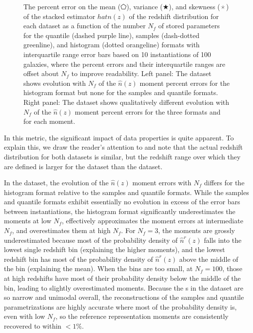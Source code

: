 \begin{figure}
\begin{center}
		\caption{
			The percent error on the mean ($\pentagon$), variance ($\bigstar$), and 
			skewness ($\APLstar$) of the stacked estimator $hat{n}(z)$ of the redshift 
			distribution for each dataset as a function of the number $N_{f}$ of stored 
			parameters for the quantile (dashed purple line), samples (dash-dotted 
			greenline), and histogram (dotted orangeline) formats with interquartile range 
			error bars based on 10 instantiations of 100 galaxies, where the percent errors 
			and their interquartile ranges are offset about $N_{f}$ to improve readability.
			Left panel: The \mgdata dataset shows evolution with $N_{f}$ of the 
			$\hat{n}(z)$ moment percent errors for the histogram format but none for the 
			samples and quantile formats.
			Right panel: The \ssdata dataset shows qualitatively different evolution 
			with $N_{f}$ of the $\hat{n}(z)$ moment percent errors for the three formats 
			and for each moment.
			}
	\end{center}
\end{figure}
In this metric, the significant impact of data properties is quite apparent.
To explain this, we draw the reader's attention to  and 
note that the actual redshift distribution for both datasets is similar, but 
the redshift range over which they are defined is larger for the \mgdata 
dataset than the \ssdata dataset.

In the \mgdata dataset, the evolution of the $\hat{n}(z)$ moment errors with 
$N_{f}$ differs for the histogram format relative to the samples and quantile 
formats.
While the samples and quantile formats exhibit essentially no evolution in 
excess of the error bars between instantiations, the histogram format 
significantly underestimates the moments at low $N_{f}$, effectively 
approximates the moment errors at intermediate $N_{f}$, and overestimates them 
at high $N_{f}$.
For $N_{f}=3$, the moments are grossly underestimated because most of the 
probability density of $\hat{n}^{r}(z)$ falls into the lowest single redshift 
bin (explaining the higher moments), and the lowest redshift bin has most of 
the probability density of $\hat{n}^{r}(z)$ above the middle of the bin 
(explaining the mean).
When the bins are too small, at $N_{f}=100$, those at high redshifts have most 
of their probability density below the middle of the bin, leading to slightly 
overestimated moments.
Because the \pz s in the \mgdata dataset are so narrow and unimodal overall, 
the reconstructions of the samples and quantile parametrizations are highly 
accurate where most of the probability density is, even with low $N_{f}$, so 
the reference representation moments are consistently recovered to within 
$<1\%$.

